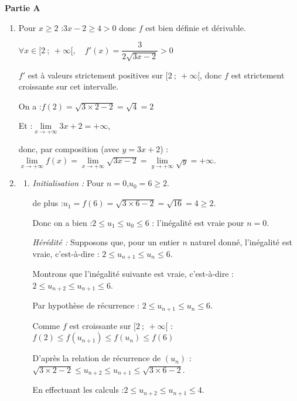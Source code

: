 \medskip

	\textbf{Partie A}

	\medskip

	\begin{enumerate}
		\item Pour $x \geqslant 2$ :\quad $3x - 2 \geqslant 4 > 0$ donc $f$ est bien définie et dérivable.

		$\forall x \in [2 ~;~+\infty [,\quad f'(x) = \dfrac{3}{2\sqrt{3x-2}} > 0$

		$f'$ est à valeurs strictement positives sur $[2~;~+\infty[$, donc $f$ est strictement croissante sur cet intervalle.

		On a :\quad $f(2) = \sqrt{3\times 2 - 2} = \sqrt{4} = 2$

		Et :\quad $\lim\limits_{x \to +\infty} 3x + 2 = +\infty$,

		donc, par composition (avec $y = 3x + 2$) :\quad $\lim\limits_{x \to +\infty} f(x) = \lim\limits_{x \to +\infty} \sqrt{3x - 2} = \lim\limits_{y \to +\infty} \sqrt{y} = +\infty$.

		\item
		\begin{enumerate}
			\item \emph{Initialisation :} Pour $n = 0$,\quad $u_0 = 6 \geqslant 2$.

			de plus :\quad $u_1 = f(6) = \sqrt{3\times 6 - 2} = \sqrt{16} = 4 \geqslant 2$.

			Donc on a bien :\quad $2 \leqslant u_1 \leqslant u_0 \leqslant 6$ : l'inégalité est vraie pour $n =0$.

			\emph{Hérédité :} Supposons que, pour un entier $n$ naturel donné, l'inégalité est vraie, c'est-à-dire : \quad $2 \leqslant u_{n+1} \leqslant u_n \leqslant 6$.


			Montrons que l'inégalité suivante est vraie, c'est-à-dire :\quad $2 \leqslant u_{n+2} \leqslant u_{n+1}\leqslant 6$.

			Par hypothèse de récurrence : \quad $2 \leqslant u_{n+1} \leqslant u_n \leqslant 6$.

			Comme $f$ est croissante sur $[2 ~;~ + \infty[$ :\quad $f(2) \leqslant f(u_{n+1}) \leqslant f(u_n)\leqslant f(6)$

			D'après la relation de récurrence de $(u_n)$ :\quad $\sqrt{3\times 2 - 2} \leqslant u_{n+2} \leqslant u_{n+1}\leqslant \sqrt{3\times 6 - 2}$.

			En effectuant les calculs :\quad $2 \leqslant u_{n+2} \leqslant u_{n+1}\leqslant 4$.


\end{enumerate}
\end{enumerate}
